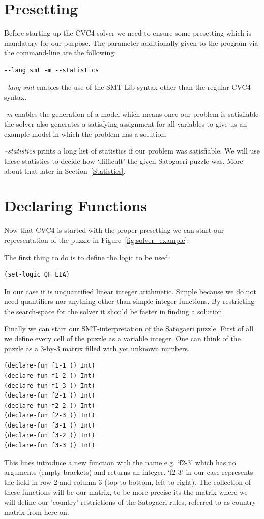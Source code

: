 \section{Presetting}
Before starting up the CVC4 solver we need to ensure some presetting which is mandatory for our purpose.
The parameter additionally given to the program via the command-line are the following:
\begin{lstlisting}
--lang smt -m --statistics
\end{lstlisting}

\emph{--lang smt} enables the use of the SMT-Lib syntax other than the regular CVC4 syntax.

\emph{-m} enables the generation of a model which means once our problem is satisfiable the solver also generates a satisfying assignment for all variables to give us an example model in which the problem has a solution.

\emph{--statistics} prints a long list of statistics if our problem was satisfiable. We will use these statistics to decide how `difficult' the given Satogaeri puzzle was. More about that later in Section~\ref{Statistics}. 

\section{Declaring Functions}
Now that CVC4 is started with the proper presetting we can start our representation of the puzzle in Figure~\ref{fig:solver_example}.

The first thing to do is to define the logic to be used:
\begin{lstlisting}
(set-logic QF_LIA)
\end{lstlisting}
In our case it is unquantified linear integer arithmetic. Simple because we do not need quantifiers nor anything other than simple integer functions. By restricting the search-space for the solver it should be faster in finding a solution.

Finally we can start our SMT-interpretation of the Satogaeri puzzle. First of all we define every cell of the puzzle as a variable integer. One can think of the puzzle as a 3-by-3 matrix filled with yet unknown numbers.
\begin{lstlisting}
(declare-fun f1-1 () Int)
(declare-fun f1-2 () Int)
(declare-fun f1-3 () Int)
(declare-fun f2-1 () Int)
(declare-fun f2-2 () Int)
(declare-fun f2-3 () Int)
(declare-fun f3-1 () Int)
(declare-fun f3-2 () Int)
(declare-fun f3-3 () Int)
\end{lstlisting}
This lines introduce a new function with the name e.g. `f2-3' which has no arguments (empty brackets) and returns an integer. `f2-3' in our case represents the field in row 2 and column 3 (top to bottom, left to right). The collection of these functions will be our matrix, to be more precise its the matrix where we will define our 'country' restrictions of the Satogaeri rules, referred to as country-matrix from here on.

